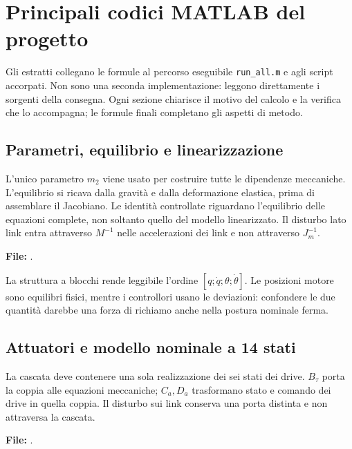\chapter{Principali codici MATLAB del progetto}\label{app:matlab}
Gli estratti collegano le formule al percorso eseguibile
\texttt{run\_all.m} e agli script accorpati. Non sono una seconda
implementazione: leggono direttamente i sorgenti della consegna.
Ogni sezione chiarisce il motivo del calcolo e la verifica che lo
accompagna; le formule finali completano gli aspetti di metodo.

\section{Parametri, equilibrio e linearizzazione}
L'unico parametro $m_2$ viene usato per costruire tutte le dipendenze
meccaniche. L'equilibrio si ricava dalla gravità e dalla deformazione
elastica, prima di assemblare il Jacobiano. Le identità controllate
riguardano l'equilibrio delle equazioni complete, non soltanto quello
del modello linearizzato. Il disturbo lato link entra attraverso
$M^{-1}$ nelle accelerazioni dei link e non attraverso $J_m^{-1}$.

\par\medskip\noindent\begin{minipage}{\linewidth}
\noindent\textbf{File:} .

\end{minipage}\par\medskip

La struttura a blocchi rende leggibile l'ordine $[q;\dot q;\theta;\dot\theta]$.
Le posizioni motore sono equilibri fisici, mentre i controllori usano
le deviazioni: confondere le due quantità darebbe una forza di richiamo
anche nella postura nominale ferma.

\section{Attuatori e modello nominale a 14 stati}
La cascata deve contenere una sola realizzazione dei sei stati dei drive.
$B_\tau$ porta la coppia alle equazioni meccaniche; $C_a,D_a$ trasformano
stato e comando dei drive in quella coppia. Il disturbo sui link conserva
una porta distinta e non attraversa la cascata.

\par\medskip\noindent\begin{minipage}{\linewidth}
\noindent\textbf{File:} .

\end{minipage}\par\medskip

